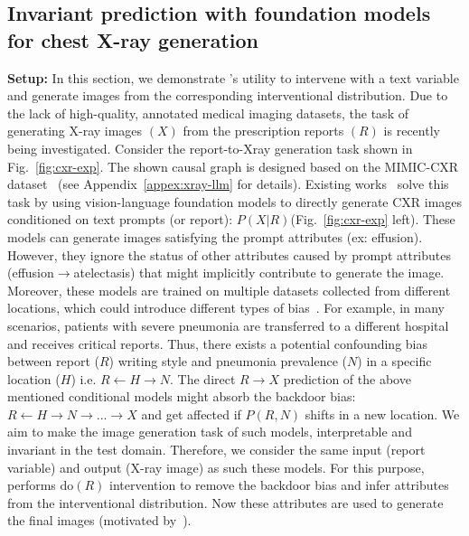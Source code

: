 \documentclass{article}
\newcommand{\Do}{\text{do}}
\newcommand{\idgen}{\text{ID-GEN}\xspace}
\theoremstyle{plain}
\theoremstyle{definition}
\theoremstyle{remark}
\begin{document}
\subsection{Invariant prediction with foundation models for chest X-ray generation}
\label{sec:mimic}
%
\textbf{Setup:}
In this section, we demonstrate \idgen's utility to intervene with a text variable and generate images from the corresponding interventional distribution. 
Due to the lack of high-quality, annotated medical imaging datasets, the task of generating X-ray images $(X)$ from the prescription reports $(R)$ is recently being investigated.
Consider the report-to-Xray  generation task shown in Fig.~\ref{fig:cxr-exp}.
The shown causal graph is designed based on the MIMIC-CXR dataset~\cite{johnson2019mimic} (see Appendix~\ref{appex:xray-llm} for details).
%
Existing works~\citep{chambon2022roentgen} solve this task by using vision-language foundation models to directly generate CXR images conditioned on text prompts (or report): $P(X|R)$(Fig.~\ref{fig:cxr-exp} left).
These models can generate images satisfying the prompt attributes (ex: effusion). However, they ignore the status of other attributes caused by prompt attributes (effusion$\rightarrow$atelectasis) that might implicitly contribute to generate the image.
%
%
%
Moreover, these models are trained on multiple datasets collected from different locations, which could introduce different types of bias~\citep{catala2021bias}. For example, in many scenarios, patients with severe pneumonia are transferred to a different hospital and receives critical reports.
Thus, there exists a potential confounding bias between report ($R$) writing style and pneumonia prevalence ($N$) in a specific location ($H$) i.e. $R\leftarrow H \rightarrow N$.
%
The direct $R\rightarrow X$ prediction of the above mentioned conditional models might absorb the backdoor bias: $R \leftarrow H \rightarrow N \rightarrow ...\rightarrow X$ and get affected if $P(R, N)$ shifts in a new location.
%
We aim to make the image generation task of such models, interpretable and invariant in the test domain.
%
%
Therefore, we consider the same input (report variable) and output (X-ray image) as such these models.
For this purpose, \idgen  performs $\Do(R)$ intervention 
to remove the backdoor bias and infer attributes from the interventional distribution.
Now these attributes are used to generate the final images (motivated by~\citep{subbaswamy2019preventing, lee2023finding}).
\end{document}
